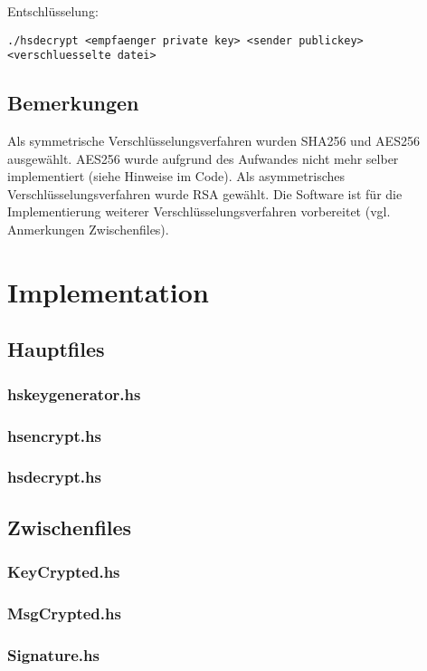 \documentclass[11pt,a4paper,parskip=half]{scrartcl}
\begin{document}
Entschlüsselung:
\begin{lstlisting}
./hsdecrypt <empfaenger private key> <sender publickey> <verschluesselte datei>
\end{lstlisting}

\subsection{Bemerkungen}
Als symmetrische Verschlüsselungsverfahren wurden SHA256 und AES256 ausgewählt. AES256 wurde aufgrund des Aufwandes nicht mehr selber implementiert (siehe Hinweise im Code). Als asymmetrisches Verschlüsselungsverfahren wurde RSA gewählt.
Die Software ist für die Implementierung weiterer Verschlüsselungsverfahren vorbereitet (vgl. Anmerkungen Zwischenfiles).

\section{Implementation}
\subsection{Hauptfiles}
\subsubsection{hskeygenerator.hs}

\subsubsection{hsencrypt.hs}

\subsubsection{hsdecrypt.hs}

\subsection{Zwischenfiles}
\subsubsection{KeyCrypted.hs}

\subsubsection{MsgCrypted.hs}

\subsubsection{Signature.hs}

\end{document}
